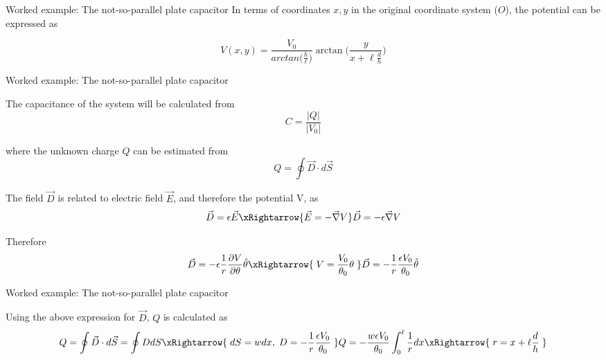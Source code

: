 {\begin{frame}{Worked example: The not-so-parallel plate capacitor}
In terms of coordinates $x,y$ in the original coordinate system ($O$),
the potential can be expressed as

  \begin{equation*}
    V(x,y) =  \frac{V_0}{arctan\Big(\frac{h}{\ell}\Big)}
     \arctan\Big(\frac{y}{x+\ell \frac{d}{h}}\Big)
  \end{equation*}

\end{frame}

%
%
%

\begin{frame}{Worked example: The not-so-parallel plate capacitor}

The capacitance of the system will be calculated from
  \begin{equation*}
    C = \frac{|Q|}{|V_0|}
  \end{equation*}

where the unknown charge $Q$ can be estimated from
  \begin{equation*}
    Q = \oint \vec{D} \cdot d\vec{S}
  \end{equation*}

The field $\vec{D}$ is related to electric field $\vec{E}$,
and therefore the potential V, as
  \begin{equation*}
    \vec{D} = \epsilon \vec{E} \xRightarrow{\vec{E} = -\vec{\nabla}V}
    \vec{D} = -\epsilon \vec{\nabla}V
  \end{equation*}

Therefore
  \begin{equation*}
    \vec{D} =
      -\epsilon \frac{1}{r} \frac{\partial V}{\partial \theta} \hat{\theta}
      \xRightarrow{\;V =  \frac{V_0}{\theta_0} \theta \;}
    \vec{D} = - \frac{1}{r} \frac{\epsilon V_0}{\theta_0} \hat{\theta}
  \end{equation*}

\end{frame}

%
%
%

\begin{frame}{Worked example: The not-so-parallel plate capacitor}

Using the above expression for $\vec{D}$, $Q$ is calculated as
  \begin{equation*}
    Q = \oint \vec{D} \cdot d\vec{S} = \oint D dS
     \xRightarrow{\; dS = w dx, \; D = - \frac{1}{r} \frac{\epsilon V_0}{\theta_0} \;}
     Q = -\frac{w \epsilon V_0}{\theta_0} \int_{0}^{\ell} \frac{1}{r} dx
      \xRightarrow{\; r = x + \ell \frac{d}{h} \;}
  \end{equation*}


\end{frame}}
